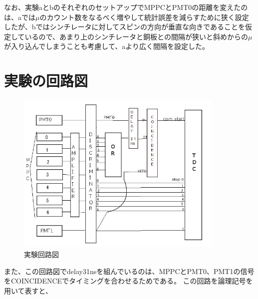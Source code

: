 なお、実験aとbのそれぞれのセットアップでMPPCとPMT0の距離を変えたのは、aでは$\mu$のカウント数をなるべく増やして統計誤差を減らすために狭く設定したが、bではシンチレータに対してスピンの方向が垂直な向きであることを仮定しているので、あまり上のシンチレータと銅板との間隔が狭いと斜めからの$\mu$が入り込んでしまうことも考慮して、aより広く間隔を設定した。
\section{実験の回路図}
\begin{figure}[htbm]
  \includegraphics[width=10cm]{kairo.jpg}
  \caption{実験回路図}
\end{figure}
また、この回路図でdelay31nsを組んでいるのは、MPPCとPMT0、PMT1の信号をCOINCIDENCEでタイミングを合わせるためである。
この回路を論理記号を用いて表すと、
